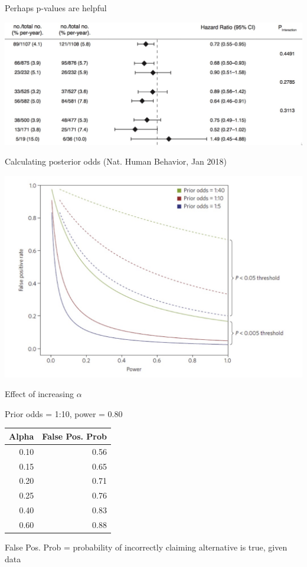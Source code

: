\documentclass[ignorenonframetext,]{beamer}
\begin{document}
\begin{frame}{Perhaps p-values are helpful}
\protect\hypertarget{perhaps-p-values-are-helpful}{}

\centering

\includegraphics{../figures/me_interaction.jpeg}

\end{frame}

\begin{frame}{Calculating posterior odds (Nat. Human Behavior, Jan
2018)}
\protect\hypertarget{calculating-posterior-odds-nat.-human-behavior-jan-2018}{}

\includegraphics[width=1\textwidth,height=\textheight]{../figures/ppv_threshold.jpeg}

\end{frame}

\begin{frame}{Effect of increasing \(\alpha\)}
\protect\hypertarget{effect-of-increasing-alpha}{}

Prior odds = 1:10, power = 0.80

\begin{longtable}[]{@{}rr@{}}
\toprule
Alpha & False Pos. Prob\tabularnewline
\midrule
\endhead
0.10 & 0.56\tabularnewline
0.15 & 0.65\tabularnewline
0.20 & 0.71\tabularnewline
0.25 & 0.76\tabularnewline
0.40 & 0.83\tabularnewline
0.60 & 0.88\tabularnewline
\bottomrule
\end{longtable}

False Pos. Prob = probability of incorrectly claiming alternative is
true, given data

\end{frame}
\end{document}
